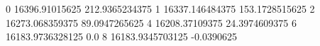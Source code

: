 0 16396.91015625 212.9365234375
1 16337.146484375 153.1728515625
2 16273.068359375 89.0947265625
4 16208.37109375 24.3974609375
6 16183.9736328125 0.0
8 16183.9345703125 -0.0390625
